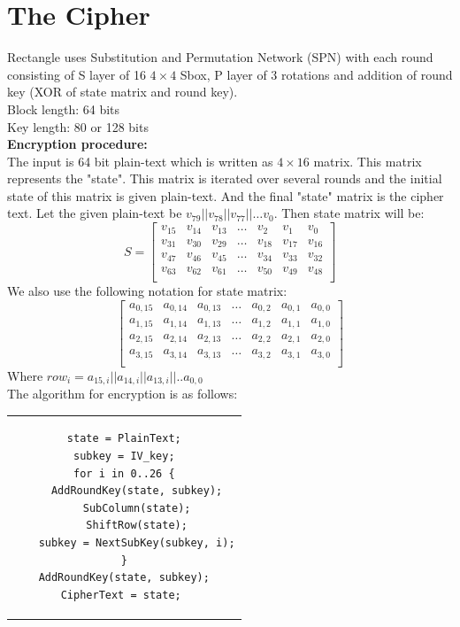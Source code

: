 \documentclass[final]{transcrypto}
\begin{document}
\section{The Cipher}
Rectangle uses Substitution and Permutation Network (SPN) with each round consisting of S layer of 16 $4 \times 4$ Sbox, P layer of 3 rotations and addition of round key (XOR of state matrix and round key).\\
\newline
Block length: 64 bits\\
Key length: 80 or 128 bits\\
\newline
\textbf{Encryption procedure:}\\
The input is 64 bit plain-text which is written as $4\times 16$ matrix. This matrix represents the "state". This matrix is iterated over several rounds and the initial state of this matrix is given plain-text. And the final "state" matrix is the cipher text. Let the given plain-text be $v_{79}||v_{78}||v_{77}||\dots v_{0}$. Then state matrix will be:
$$S=
\begin{bmatrix}
v_{15} & v_{14} & v_{13} & \dots & v_{2} & v_{1} & v_{0}\\
v_{31} & v_{30} & v_{29} & \dots & v_{18} & v_{17} & v_{16}\\
v_{47} & v_{46} & v_{45} & \dots & v_{34} & v_{33} & v_{32}\\
v_{63} & v_{62} & v_{61} & \dots & v_{50} & v_{49} & v_{48}\\
\end{bmatrix}
$$
We also use the following notation for state matrix:
$$
\begin{bmatrix}
a_{0,15} & a_{0,14} & a_{0,13} & \dots & a_{0,2} & a_{0,1} & a_{0,0}\\
a_{1,15} & a_{1,14} & a_{1,13} & \dots & a_{1,2} & a_{1,1} & a_{1,0}\\
a_{2,15} & a_{2,14} & a_{2,13} & \dots & a_{2,2} & a_{2,1} & a_{2,0}\\
a_{3,15} & a_{3,14} & a_{3,13} & \dots & a_{3,2} & a_{3,1} & a_{3,0}\\
\end{bmatrix}
$$
Where $row_{i} = a_{15,i}||a_{14,i}||a_{13,i}||..a_{0,0}$\\
The algorithm for encryption is as follows:
\begin{center}
\begin{tabular}{c}
\begin{lstlisting}
state = PlainText;
subkey = IV_key;
for i in 0..26 {
    AddRoundKey(state, subkey);
    SubColumn(state);
    ShiftRow(state);
    subkey = NextSubKey(subkey, i);
}
AddRoundKey(state, subkey);
CipherText = state; 
\end{lstlisting}\\
\end{tabular}
\end{center}
\end{document}
